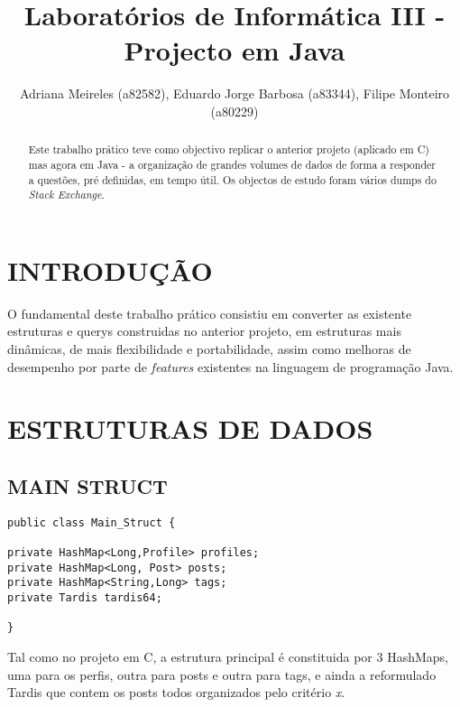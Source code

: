 \documentclass[letterpaper, 10 pt, conference]{IEEEtran}  %
\title{\LARGE \bf
Laboratórios de Informática III - Projecto em Java
}
\author{Adriana Meireles (a82582), Eduardo Jorge Barbosa (a83344), Filipe Monteiro (a80229)%
}
\begin{document}
\maketitle
\thispagestyle{empty}
\pagestyle{empty}


\begin{abstract}

Este trabalho prático teve como objectivo replicar o anterior projeto (aplicado em C) mas agora em Java - a organização
de grandes volumes de dados de forma a responder a questões, pré definidas, em tempo útil. Os objectos de estudo foram vários dumps do \textit{Stack Exchange}.

\end{abstract}

\section{INTRODUÇÃO}

O fundamental deste trabalho prático consistiu em converter as existente estruturas e querys construidas no anterior projeto,
em estruturas mais dinâmicas, de mais flexibilidade e portabilidade, assim como melhoras de desempenho por parte de
\textit{features} existentes na linguagem de programação Java.

\section{ESTRUTURAS DE DADOS}

\subsection{MAIN STRUCT}

\begin{lstlisting}
public class Main_Struct {

private HashMap<Long,Profile> profiles;
private HashMap<Long, Post> posts;
private HashMap<String,Long> tags;
private Tardis tardis64;

}
\end{lstlisting}

Tal como no projeto em C, a estrutura principal é constituida por 3 HashMaps, uma para os perfis, outra para posts
e outra para tags, e ainda a reformulado Tardis que contem os posts todos organizados pelo critério \textit{x}.
\end{document}
